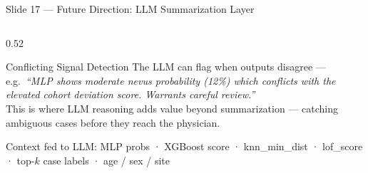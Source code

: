 \documentclass[aspectratio=169, 9pt]{beamer}
\begin{document}
\begin{frame}{Slide 17 --- Future Direction: LLM Summarization Layer}
\begin{columns}[T]
\begin{column}{0.52\textwidth}
      \vspace{0.3em}
      \begin{alertblock}{Conflicting Signal Detection}
        \scriptsize
        The LLM can flag when outputs disagree --- e.g.\
        \textit{``MLP shows moderate nevus probability (12\%)
        which conflicts with the elevated cohort deviation
        score. Warrants careful review.''}\\[0.3em]
        This is where LLM reasoning adds value beyond
        summarization --- catching ambiguous cases before
        they reach the physician.
      \end{alertblock}

      \vspace{0.2em}
      {\scriptsize\color{gray}
      Context fed to LLM: MLP probs · XGBoost score · knn\_min\_dist
      · lof\_score · top-$k$ case labels · age / sex / site}
    \end{column}

  \end{columns}
\end{frame}
\end{document}
